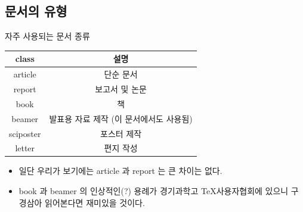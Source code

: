 \documentclass[12pt]{beamer}
\begin{document}
\subsection{문서의 유형}
\begin{frame}{자주 사용되는 문서 종류}
	\begin{tabular}{|c|c|}
		\hline
		class & 설명 \\
		\hline
		\hline
		article & 단순 문서 \\
		\hline
		report & 보고서 및 논문 \\
		\hline
		book & 책 \\
		\hline
		beamer & 발표용 자료 제작 (이 문서에서도 사용됨) \\
		\hline
		sciposter & 포스터 제작 \\
		\hline
		letter & 편지 작성 \\ 
		\hline
	\end{tabular}
	\begin{itemize}
		\item 일단 우리가 보기에는 article 과 report 는 큰 차이는 없다.
		\item book 과 beamer 의 인상적인(?) 용례가 경기과학고 \TeX 사용자협회에 있으니 구경삼아 읽어본다면 재미있을 것이다.
	\end{itemize}
\end{frame}
\end{document}
